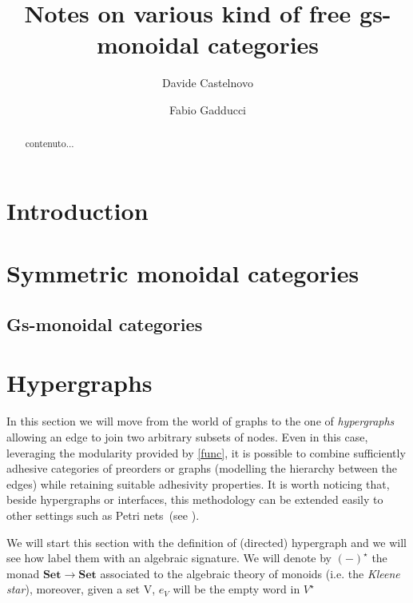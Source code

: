 \documentclass[a4paper,UKenglish,cleveref,pdftex,thm-restate,numberwithinsect]{lipics-v2021}
\author{Davide Castelnovo}
{Department of Computer Science, University of Pisa, Italy}
{castelnovod@gmail.com}
{https://orcid.org/0000-0002-5926-5615}{}
\author{Fabio Gadducci}
{Department of Computer Science, University of Pisa, Italy}
{fabio.gadducci@unipi.it}
{https://orcid.org/0000-0003-0690-3051}{}
\title{Notes on various kind of free gs-monoidal categories}
\newcommand{\cat}[1]{\ensuremath{\mathbf{#1}}}
\begin{document}
	\maketitle
\begin{abstract}
	contenuto...
\end{abstract}	

\tableofcontents
\section{Introduction}


\section{Symmetric monoidal categories}
\subsection{Gs-monoidal categories}



\section{Hypergraphs}

In this section we will move from the world of graphs to the one of \emph{hypergraphs} allowing an edge to join two arbitrary subsets of nodes. Even in this case,  leveraging the modularity provided by \cref{func}, it is possible to combine sufficiently adhesive categories of preorders or graphs (modelling the hierarchy between the edges) while retaining suitable adhesivity properties.  It is worth noticing that, beside hypergraphs or interfaces, this methodology can be extended easily to other settings such as Petri nets~(see \cite{ehrig1991parallelism}).


We will start this section with the definition of (directed) hypergraph and we will see how label them with an algebraic signature. We will denote by $(-)^\star$ the monad $\cat{Set}\to \cat{Set}$ associated to the algebraic theory of monoids (i.e. the \emph{Kleene star}), moreover, given a set V, $e_V$ will be the empty word in $V^{\star}$ 
\end{document}
